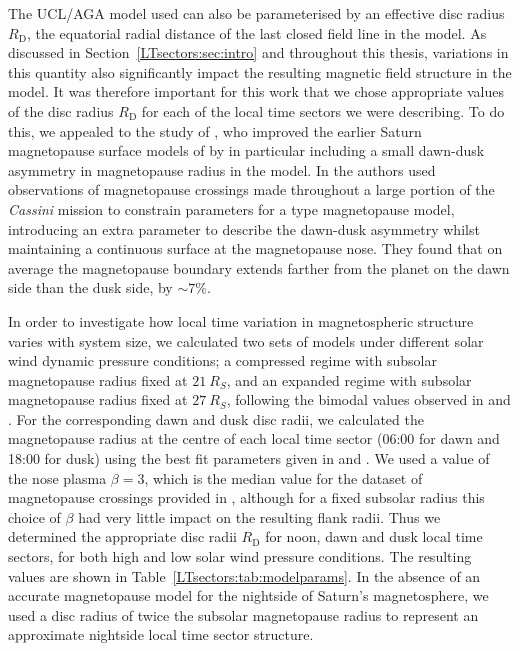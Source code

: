The UCL/AGA model used can also be parameterised by an effective disc radius $R_\mathrm{D}$, the equatorial radial distance of the last closed field line in the model. As discussed in Section~\ref{LTsectors:sec:intro} and throughout this thesis, variations in this quantity also significantly impact the resulting magnetic field structure in the model. It was therefore important for this work that we chose appropriate values of the disc radius $R_\mathrm{D}$ for each of the local time sectors we were describing. To do this, we appealed to the study of \citet{pilkington2015b}, who improved the earlier Saturn magnetopause surface models of \citet{pilkington2015, kanani2010, arridge2006} by in particular including a small dawn-dusk asymmetry in magnetopause radius in the model. In \citet{pilkington2015b} the authors used observations of magnetopause crossings made throughout a large portion of the \textit{Cassini} mission to constrain parameters for a \citet{shue1997} type magnetopause model, introducing an extra parameter to describe the dawn-dusk asymmetry whilst maintaining a continuous surface at the magnetopause nose. They found that on average the magnetopause boundary extends farther from the planet on the dawn side than the dusk side, by ${\sim}7\%$. 

In order to investigate how local time variation in magnetospheric structure varies with system size, we calculated two sets of models under different solar wind dynamic pressure conditions; a compressed regime with subsolar magnetopause radius fixed at $\SI{21}{R_S}$, and an expanded regime with subsolar magnetopause radius fixed at $\SI{27}{R_S}$, following the bimodal values observed in \citet{pilkington2015} and \citet{achilleos2008}. For the corresponding dawn and dusk disc radii, we calculated the magnetopause radius at the centre of each local time sector (06:00 for dawn and 18:00 for dusk) using the best fit parameters given in \citet{pilkington2015} and \citet{pilkington2015b}. We used a value of the nose plasma $\beta = 3$, which is the median value for the dataset of magnetopause crossings provided in \citet{pilkington2015}, although for a fixed subsolar radius this choice of $\beta$ had very little impact on the resulting flank radii. Thus we determined the appropriate disc radii $R_\mathrm{D}$ for noon, dawn and dusk local time sectors, for both high and low solar wind pressure conditions. The resulting values are shown in Table~\ref{LTsectors:tab:modelparams}. In the absence of an accurate magnetopause model for the nightside of Saturn's magnetosphere, we used a disc radius of twice the subsolar magnetopause radius to represent an approximate nightside local time sector structure.

